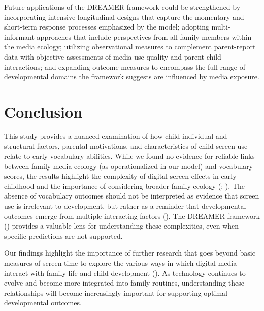 \documentclass[
  man,
  floatsintext,
  longtable,
  nolmodern,
  notxfonts,
  notimes,
  colorlinks=true,linkcolor=blue,citecolor=blue,urlcolor=blue]{apa7}
\begin{document}
Future applications of the DREAMER framework could be strengthened by
incorporating intensive longitudinal designs that capture the momentary
and short-term response processes emphasized by the model; adopting
multi-informant approaches that include perspectives from all family
members within the media ecology; utilizing observational measures to
complement parent-report data with objective assessments of media use
quality and parent-child interactions; and expanding outcome measures to
encompass the full range of developmental domains the framework suggests
are influenced by media exposure.

\vspace{1em}

\section{Conclusion}\label{conclusion}

This study provides a nuanced examination of how child individual and
structural factors, parental motivations, and characteristics of child
screen use relate to early vocabulary abilities. While we found no
evidence for reliable links between family media ecology (as
operationalized in our model) and vocabulary scores, the results
highlight the complexity of digital screen effects in early childhood
and the importance of considering broader family ecology
(;
).
The absence of vocabulary outcomes should not be interpreted as evidence
that screen use is irrelevant to development, but rather as a reminder
that developmental outcomes emerge from multiple interacting factors
().
The DREAMER framework () provides a valuable lens for understanding these
complexities, even when specific predictions are not supported.

Our findings highlight the importance of further research that goes
beyond basic measures of screen time to explore the various ways in
which digital media interact with family life and child development
(). As technology continues to evolve and become more
integrated into family routines, understanding these relationships will
become increasingly important for supporting optimal developmental
outcomes.
\end{document}
